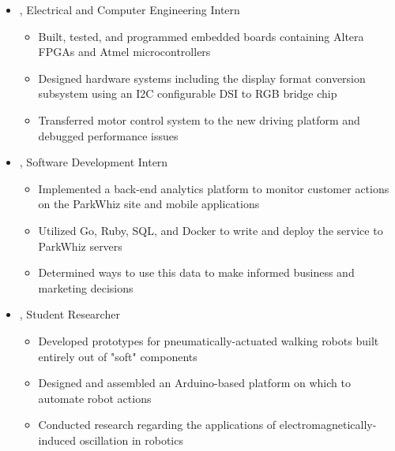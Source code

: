 \documentclass[10pt,letterpaper]{article}
\begin{document}
\begin{itemize}[label={}]
 \item \small{, Electrical and Computer Engineering Intern  \hfill {}}
 \vspace{-1.58mm}
 \begin{itemize}[label={}]
    \item \small{Built, tested, and programmed embedded boards containing Altera FPGAs and Atmel microcontrollers}
 	\item \small{Designed hardware systems including the display format conversion subsystem using an I2C configurable DSI to RGB bridge chip}
 	\item \small{Transferred motor control system to the new driving platform and debugged performance issues}
 \end{itemize}
 \item \small{, Software Development Intern  \hfill {}}
 \vspace{-1.58mm}
 \begin{itemize}[label={}]
 	\item \small{Implemented a back-end analytics platform to monitor customer actions on the ParkWhiz site and mobile applications}
 	\item \small{Utilized Go, Ruby, SQL, and Docker to write and deploy the service to ParkWhiz servers}
 	\item \small{Determined ways to use this data to make informed business and marketing decisions}
 \end{itemize}
 \item \small{, Student Researcher  \hfill {}}
 \vspace{-1.58mm}
 \begin{itemize}[label={}]
 	\item \small{Developed prototypes for pneumatically-actuated walking robots built entirely out of "soft" components}
 	\item \small{Designed and assembled an Arduino-based platform on which to automate robot actions}
 	\item \small{Conducted research regarding the applications of electromagnetically-induced oscillation in robotics}
 \end{itemize}
\end{itemize}
\end{document}
